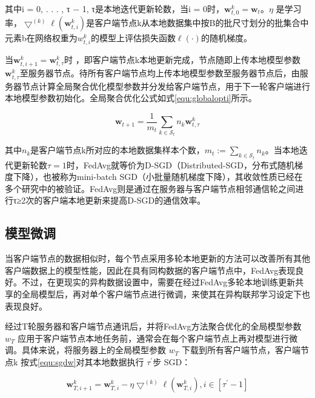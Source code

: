 其中i = 0, . . . , τ − 1,  τ是本地迭代更新轮数，当i = 0时，$\boldsymbol{w}^{k}_{t, 0}=\boldsymbol{w}_{t}$。$\eta$ 是学习率，$\bigtriangledown^{(k)} \ell\left(\boldsymbol{w}^{k}_{t, i}\right)$是客户端节点k从本地数据集中按B的批尺寸划分的批集合中元素b在网络权重为$w^{k}_{t,i}$的模型上评估损失函数$\ell(·)$的随机梯度。

当$\boldsymbol{w}^{k}_{t, i+1} = \boldsymbol{w}^{k}_{t, \tau}$时  ，即客户端节点k本地更新完成，节点随即上传本地模型参数$\boldsymbol{w}^{k}_{t,\tau}$至服务器节点。待所有客户端节点均上传本地模型参数至服务器节点后，由服务器节点计算全局聚合优化模型参数并分发给客户端节点，用于下一轮客户端进行本地模型参数初始化。全局聚合优化公式如式\ref{equ:globalopti}所示。

\begin{equation}\label{equ:globalopti}
  \boldsymbol{w}_{t+1}=\frac{1}{m_{t}} \sum_{k \in \mathcal{S}_{t}} n_{k}\boldsymbol{w}^{k}_{t,\tau}
\end{equation}

其中$n_{k}$是客户端节点k所对应的本地数据集样本个数，$m_{t}:=\sum_{k \in \mathcal{S}_{t}} n_{k}$。当本地迭代更新轮数$\tau=1$时，FedAvg就等价为D-SGD（Distributed-SGD，分布式随机梯度下降），也被称为mini-batch SGD（小批量随机梯度下降），其收敛性质已经在多个研究中的被验证。FedAvg则是通过在服务器与客户端节点相邻通信轮之间进行τ≥2次的客户端本地更新来提高D-SGD的通信效率。

\subsection{模型微调}
当客户端节点的数据相似时，每个节点采用多轮本地更新的方法可以改善所有其他客户端数据上的模型性能，因此在具有同构数据的客户端节点中，FedAvg表现良好。不过，在更现实的异构数据设置中，需要在经过FedAvg多轮本地训练更新共享的全局模型后，再对单个客户端节点进行微调，来使其在异构联邦学习设定下也表现良好。

经过T轮服务器和客户端节点通讯后，并将FedAvg方法聚合优化的全局模型参数 $w_{T}$ 应用于客户端节点本地任务前，通常会在每个客户端节点上再对模型进行微调。具体来说，将服务器上的全局模型参数 $w_{T}$ 下载到所有客户端节点，客户端节点k 按式\ref{equ:sgdw}对其本地数据执行 $\tau^{\prime}$步 SGD：

\begin{equation}\label{equ:sgdw}
  \boldsymbol{w}^{k}_{T, i+1}=\boldsymbol{w}^{k}_{T,i}-\eta \bigtriangledown^{(k)} \ell\left(\boldsymbol{w}^{k}_{T,i}\right),i \in\left[\tau^{\prime}-1\right]
\end{equation}

